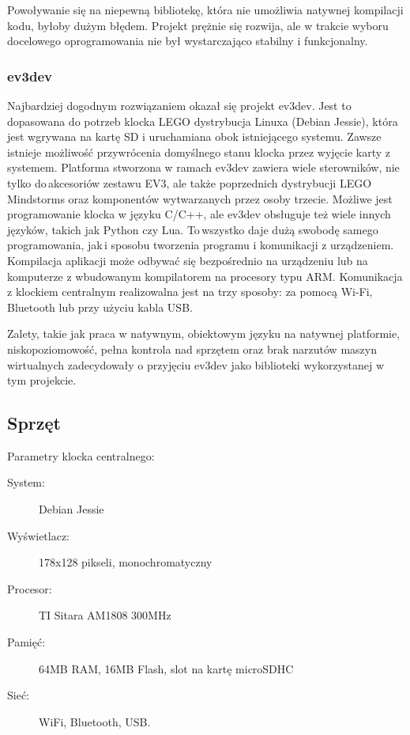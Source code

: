 Powoływanie się na niepewną bibliotekę, która nie umożliwia natywnej kompilacji kodu, byłoby dużym błędem. Projekt prężnie się rozwija, ale w trakcie wyboru docelowego oprogramowania nie był wystarczająco stabilny i funkcjonalny.

\subsubsection{ev3dev}

Najbardziej dogodnym rozwiązaniem okazał się projekt ev3dev. Jest to dopasowana do potrzeb klocka LEGO dystrybucja Linuxa (Debian Jessie), która jest wgrywana na kartę SD i uruchamiana obok istniejącego systemu. Zawsze istnieje możliwość przywrócenia domyślnego stanu klocka przez wyjęcie karty z systemem. Platforma stworzona w ramach ev3dev zawiera wiele sterowników, nie tylko do\,akcesoriów zestawu EV3, ale także poprzednich dystrybucji LEGO Mindstorms oraz komponentów wytwarzanych przez osoby trzecie. Możliwe jest programowanie klocka w języku C/C++, ale ev3dev obsługuje też wiele innych języków, takich jak Python czy Lua. To\,wszystko daje dużą swobodę samego programowania, jak\,i sposobu tworzenia programu i komunikacji z urządzeniem. Kompilacja aplikacji może odbywać się bezpośrednio na urządzeniu lub na komputerze z wbudowanym kompilatorem na procesory typu ARM. Komunikacja z klockiem centralnym realizowalna jest na trzy sposoby: za pomocą Wi-Fi, Bluetooth lub przy użyciu kabla USB.

Zalety, takie jak praca w natywnym, obiektowym języku na natywnej platformie, niskopoziomowość, pełna kontrola nad sprzętem oraz brak narzutów maszyn wirtualnych zadecydowały o przyjęciu ev3dev jako biblioteki wykorzystanej w tym projekcie.

\subsection{Sprzęt}

Parametry klocka centralnego:
\begin{description}
    \item[System:] Debian Jessie
    \item[Wyświetlacz:] 178x128 pikseli, monochromatyczny
    \item[Procesor:] TI Sitara AM1808 300MHz
    \item[Pamięć:] 64MB RAM, 16MB Flash, slot na kartę microSDHC
    \item[Sieć:] WiFi, Bluetooth, USB.
\end{description}

